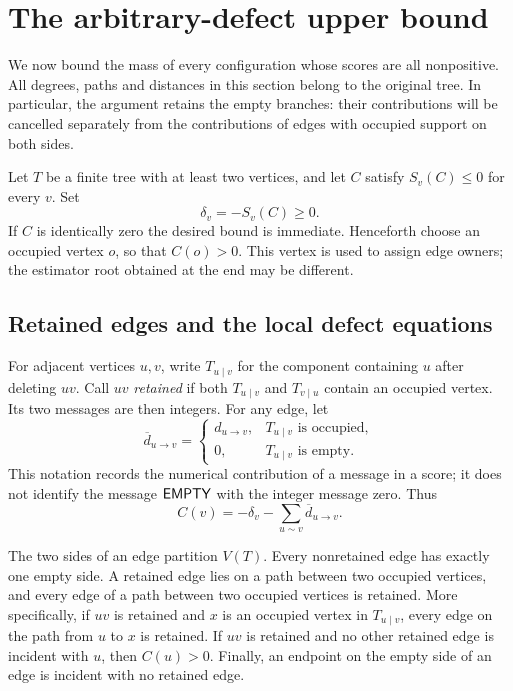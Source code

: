 \section{The arbitrary-defect upper bound}\label{sec:upper}

We now bound the mass of every configuration whose scores are all
nonpositive.  All degrees, paths and distances in this section belong to the
original tree.  In particular, the argument retains the empty branches:
their contributions will be cancelled separately from the contributions of
edges with occupied support on both sides.

Let $T$ be a finite tree with at least two vertices, and let $C$ satisfy
$S_v(C)\leq 0$ for every $v$.  Set
\[
 \delta_v=-S_v(C)\geq 0.
\]
If $C$ is identically zero the desired bound is immediate.  Henceforth choose
an occupied vertex $o$, so that $C(o)>0$.  This vertex is used to assign edge
owners; the estimator root obtained at the end may be different.

\subsection{Retained edges and the local defect equations}

For adjacent vertices $u,v$, write $T_{u\mid v}$ for the component containing
$u$ after deleting $uv$.  Call $uv$ \emph{retained} if both
$T_{u\mid v}$ and $T_{v\mid u}$ contain an occupied vertex.  Its two messages
are then integers.  For any edge, let
\[
 \overline d_{u\to v}=
 \begin{cases}
 d_{u\to v},&T_{u\mid v}\text{ is occupied},\\
 0,&T_{u\mid v}\text{ is empty}.
 \end{cases}
\]
This notation records the numerical contribution of a message in a score;
it does not identify the message $\mathsf{EMPTY}$ with the integer message
zero.  Thus
\begin{equation}\label{eq:upper-score}
 C(v)=-\delta_v-\sum_{u\sim v}\overline d_{u\to v}.
\end{equation}

\begin{lemma}\label{lem:upper-support}
The two sides of an edge partition $V(T)$.  Every nonretained edge has
exactly one empty side.  A retained edge lies on a path between two occupied
vertices, and every edge of a path between two occupied vertices is retained.
More specifically, if $uv$ is retained and $x$ is an occupied vertex in
$T_{u\mid v}$, every edge on the path from $u$ to $x$ is retained.  If
$uv$ is retained and no other retained edge is incident with $u$, then
$C(u)>0$.
Finally, an endpoint on the empty side of an edge is incident with no
retained edge.
\end{lemma}

